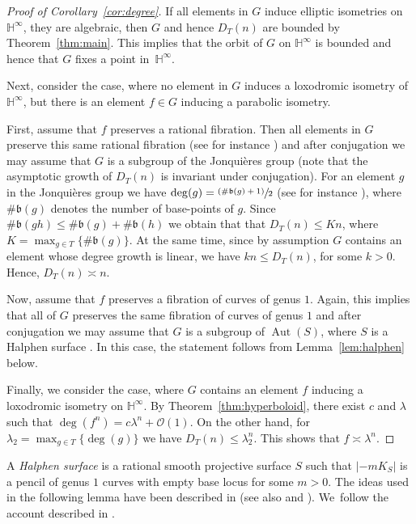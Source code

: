 \documentclass[JEP,XML,SOM,Unicode, NoEqCountersInSection,published]{cedram}
\newcommand{\psfrac}[2]{\sfrac{(#1)}{#2}}
\newcommand{\h}{\operatorname{\mathbb{H}^{\infty}}}
\newcommand{\bp}{\mathfrak{b}}
\newcommand{\Aut}{\operatorname{Aut}}
\theoremstyle{plain}
\theoremstyle{definition}
\begin{document}
\begin{proof}[Proof of Corollary~\ref{cor:degree}]
If all elements in $G$ induce elliptic isometries on $\h$, \ie they are algebraic, then $G$ and hence $D_T(n)$ are bounded by Theorem~\ref{thm:main}. This implies that the orbit of $G$ on $\h$ is bounded and hence that $G$ fixes a point in~$\h$.

Next, consider the case, where no element in $G$ induces a loxodromic isometry of~$\h$, but there is an element $f\in G$ inducing a parabolic isometry.

First, assume that $f$ preserves a rational fibration. Then all elements in $G$ preserve this same rational fibration (see for instance \cite[Lem.\,5.3.4]{urech2017subgroups}) and after conjugation we may assume that $G$ is a subgroup of the Jonquières group (note that the asymptotic growth of $D_T(n)$ is invariant under conjugation). For an element $g$ in the Jonquières group we have $\deg(g)=\psfrac{\#\bp(g)+1}{2}$ (see for instance \cite{Lamy_Cremona}), where $\#\bp(g)$ denotes the number of base-points of $g$. Since $\#\bp(gh)\leq \#\bp(g)+\#\bp(h)$ we obtain that that $D_T(n)\leq Kn$, where $K=\max_{g\in T}\{\#\bp(g)\}$. At the same time, since by assumption $G$ contains an element whose degree growth is linear, we have $kn\leq D_T(n)$, for some $k>0$. Hence, $D_T(n)\asymp n$.

Now, assume that $f$ preserves a fibration of curves of genus $1$. Again, this implies that all of $G$ preserves the same fibration of curves of genus $1$ and after conjugation we may assume that $G$ is a subgroup of $\Aut(S)$, where $S$ is a Halphen surface \cite[Lem.\,5.3.4]{urech2017subgroups}. In this case, the statement follows from Lemma~\ref{lem:halphen} below.

Finally, we consider the case, where $G$ contains an element $f$ inducing a loxodromic isometry on $\h$. By Theorem~\ref{thm:hyperboloid}, there exist $c$ and $\lambda$ such that $\deg(f^n)=c\lambda^n+\mathcal{O}(1)$. On the other hand, for $\lambda_2=\max_{g\in T}\{\deg(g)\}$ we have $D_T(n)\leq \lambda_2^n$. This shows that $f\asymp \lambda^n$.
\end{proof}

A \emph{Halphen surface} is a rational smooth projective surface $S$ such that $|{-}mK_S|$ is a pencil of genus $1$ curves with empty base locus for some $m>0$. The ideas used in the following lemma have been described in \cite{gizatullin1980rational} (see also \cite{grivaux2013parabolic} and \cite{cantat2012rational}). We~follow the account described in \cite{Lamy_Cremona}.
\end{document}
